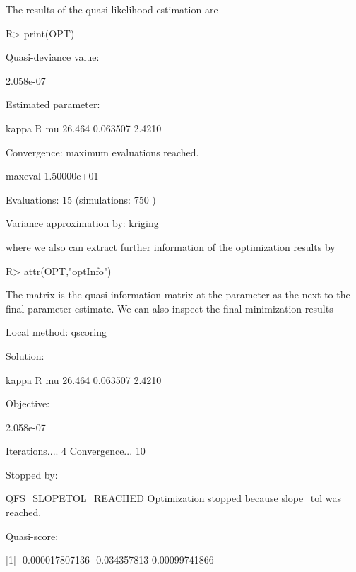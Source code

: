 \documentclass[article, nojss]{jss}
\numberwithin{equation}{section}			%
\begin{document}
The results of the quasi-likelihood estimation are
\begin{Schunk}
\begin{Sinput}
R> print(OPT)
\end{Sinput}
\begin{Soutput}
Quasi-deviance value: 

 2.058e-07 

Estimated parameter:

   kappa           R          mu    
  26.464    0.063507      2.4210    

Convergence: maximum evaluations reached.

    maxeval  
1.50000e+01  

Evaluations:  15  (simulations:  750 )

Variance approximation by:  kriging 
\end{Soutput}
\end{Schunk}
where we also can extract further information of the optimization results by
\begin{Schunk}
\begin{Sinput}
R> attr(OPT,"optInfo")
\end{Sinput}
\end{Schunk}
The matrix  is the quasi-information matrix at the parameter
 as the next to the final parameter estimate. We can also inspect
the final minimization results
\begin{Schunk}
\begin{Soutput}
Local method:  qscoring 

Solution: 

   kappa           R          mu    
  26.464    0.063507      2.4210    

Objective:

 2.058e-07 

Iterations.... 4 
Convergence... 10 

Stopped by: 

 QFS_SLOPETOL_REACHED 
 Optimization stopped because slope_tol was reached. 

Quasi-score:

[1]    -0.000017807136    -0.034357813       0.00099741866  
\end{Soutput}
\end{Schunk}
\end{document}
